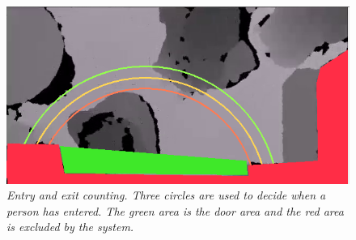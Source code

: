 \begin{figure}[htb]
	\centering
	\includegraphics[width=0.8\linewidth]{images/entry_exit_circles.png}
	\caption[Entry exit circles]{\textit{Entry and exit counting. Three circles are used to decide when a person has entered. The green area is the door area and the red area is excluded by the system.}}
	\label{fig:entry_exit}  %
\end{figure}

\newpage

